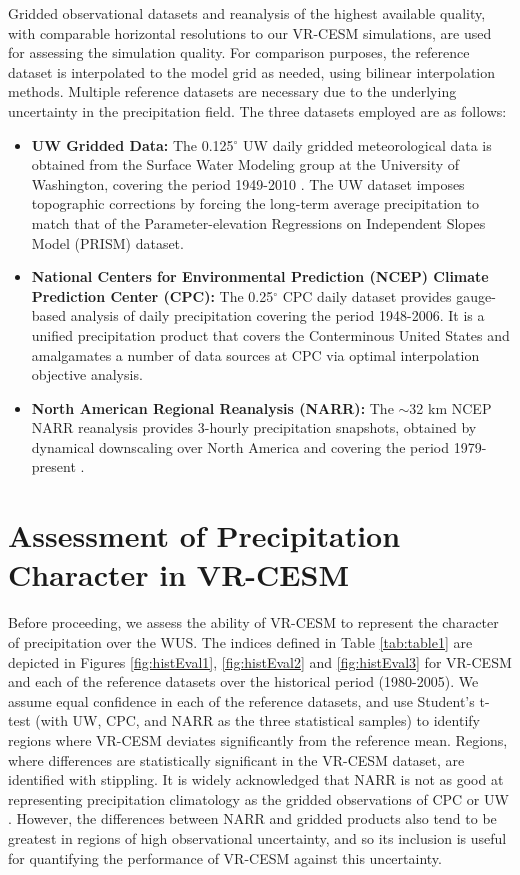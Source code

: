 \documentclass{ametsoc}
\begin{document}
Gridded observational datasets and reanalysis of the highest available quality, with comparable horizontal resolutions to our VR-CESM simulations, are used for assessing the simulation quality. For comparison purposes, the reference dataset is interpolated to the model grid as needed, using bilinear interpolation methods. Multiple reference datasets are necessary due to the underlying uncertainty in the precipitation field. The three datasets employed are as follows:

\begin{itemize}
\item[] \textbf{UW Gridded Data:}  The 0.125$^\circ$ UW daily gridded meteorological data is obtained from the Surface Water Modeling group at the University of Washington, covering the period 1949-2010 \citep{maurer2002long, hamlet2005production}. The UW dataset imposes topographic corrections by forcing the long-term average precipitation to match that of the Parameter-elevation Regressions on Independent Slopes Model (PRISM) dataset.

\item[] \textbf{National Centers for Environmental Prediction (NCEP) Climate Prediction Center (CPC):}  The 0.25$^\circ$ CPC daily dataset provides gauge-based analysis of daily precipitation covering the period 1948-2006. It is a unified precipitation product that covers the Conterminous United States and amalgamates a number of data sources at CPC via optimal interpolation objective analysis.

\item[] \textbf{North American Regional Reanalysis (NARR):}  The $\sim$32 km NCEP NARR reanalysis provides 3-hourly precipitation snapshots, obtained by dynamical downscaling over North America and covering the period 1979-present \citep{mesinger2006north}.
\end{itemize}



\section{Assessment of Precipitation Character in VR-CESM} \label{sec:ModelAssessment}

Before proceeding, we assess the ability of VR-CESM to represent the character of precipitation over the WUS.  The indices defined in Table \ref{tab:table1} are depicted in Figures \ref{fig:histEval1}, \ref{fig:histEval2} and \ref{fig:histEval3} for VR-CESM and each of the reference datasets over the historical period (1980-2005).  We assume equal confidence in each of the reference datasets, and use Student's t-test (with UW, CPC, and NARR as the three statistical samples) to identify regions where VR-CESM deviates significantly from the reference mean. Regions, where differences are statistically significant in the VR-CESM dataset, are identified with stippling. It is widely acknowledged that NARR is not as good at representing precipitation climatology as the gridded observations of CPC or UW \citep{huang2016evaluation}. However, the differences between NARR and gridded products also tend to be greatest in regions of high observational uncertainty, and so its inclusion is useful for quantifying the performance of VR-CESM against this uncertainty.
\end{document}
